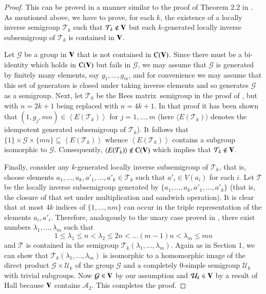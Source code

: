 \documentclass[preprint,1p,times]{elsarticle}
\numberwithin{equation}{section}
\theoremstyle{remark}
\def\pv#1{{\bf #1}}
\def\la{\lambda}
\def\Co{{\mathrm C}}
\def\Rm{Rees matrix}
\begin{document}
\begin{proof} This can be proved in a manner similar to the proof of
Theorem 2.2 in \cite{adv}.  As mentioned above, we have to prove, for each $k$, the existence of a locally inverse
semigroup $\mathcal{T}_k$ such that $\mathcal{T}_k\notin \pv V$ but each $k$-generated locally inverse subsemigroup of
$\mathcal{T}_k$ is contained in $\pv V$.

Let $\mathcal G$ be a group in $\pv V$ that is not contained in $\Co(\pv V)$. Since there must be a bi-identity which
holds in $\Co(\pv V)$ but fails in $\mathcal G$, we may assume that $\mathcal G$ is generated by finitely many
elements, say $g_1,\dots, g_m$, and for convenience we may assume that this set of generators is closed under taking
inverse elements and so generates $\mathcal{G}$ as a semigroup. Next, let $\mathcal{T}_k$ be the \Rm\ semigroup in the
proof of \cite[Theorem 2.2]{adv}, but with $n=2k+1$ being replaced with $n=4k+1$. In that proof it has been shown that
$(1,g_j,mn)\in \left<E(\mathcal{T}_k)\right>$ for $j=1,\dots, m$ (here $\langle E(\mathcal{T}_k)\rangle$ denotes the
idempotent generated subsemigroup of $\mathcal{T}_k$). It follows that $\{1\}\times \mathcal{G}\times\{mn\}\subseteq
\left<E(\mathcal{T}_k)\right>$ whence $\left<E(\mathcal{T}_k)\right>$ contains a subgroup isomorphic to $\mathcal{G}$.
Consequently, $\left<E(\mathcal{T}_k)\right>\notin \Co(\pv V)$ which implies that $\mathcal{T}_k\notin \pv V$.

Finally, consider any $k$-generated locally inverse subsemigroup of $\mathcal{T}_k$, that is, choose elements
$a_1,\dots,a_k,a'_1,\dots,a'_k\in \mathcal{T}_k$ such that $a'_i\in V(a_i)$ for each $i$. Let $\mathcal{T}$ be the
locally inverse subsemigroup generated by $\{a_1,\dots,a_k,a'_1,\dots,a'_k\}$ (that is, the closure of that set under
multiplication and sandwich operation). It is clear that at most $4k$ indices of $\{1,\dots,nm\}$ can occur in the
triple representation of the elements $a_i,a'_i$. Therefore, analogously to the unary case proved in \cite[Theorem
2.2]{adv}, there exist numbers $\la_1,\dots,\la_m$ such that
$$1\le\la_1\le n<\la_2\le 2n < \dots (m-1)n<\la_m\le mn$$
and $\mathcal{T}$ is contained in the semigroup $\mathcal{T}_k(\la_1,\dots,\la_m)$. Again as in Section 1, we can show
that $\mathcal{T}_k(\la_1,\dots,\la_m)$ is isomorphic to a homomorphic image of the direct product $\mathcal{G}\times
\mathcal{U}_k$ of the group $\mathcal G$ and a completely 0-simple semigroup $\mathcal{U}_k$ with trivial subgroups.
Now $\mathcal{G}\in \pv V$ by our assumption and $\mathcal{U}_k\in \pv V$ by a result of Hall \cite{H2} because $\pv V$
contains $\mathcal{A}_2$. This completes the proof.
\end{proof}
\end{document}
